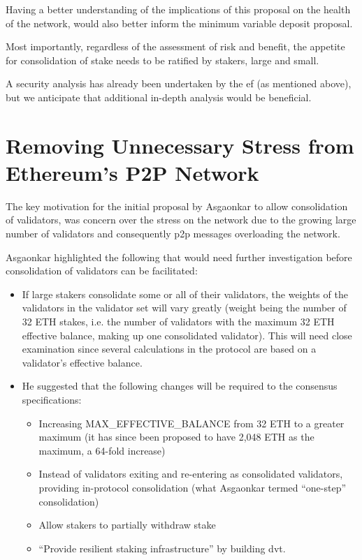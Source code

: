 \documentclass{article}
\begin{document}
Having a better understanding of the implications of this proposal on the
health of the network, would also better inform the minimum variable deposit
proposal. 

Most importantly, regardless of the assessment of risk and benefit, the
appetite for consolidation of stake needs to be ratified by stakers, large and
small.

A security analysis has already been undertaken by the \gls{ef}
\cite{Neuder2023b} (as mentioned above), but we anticipate that additional
in-depth analysis would be beneficial.

\section{Removing Unnecessary Stress from Ethereum’s P2P Network}
\label{sec:initial}
The key motivation for the initial proposal by Asgaonkar \cite{Asgaonkar2023}
to allow consolidation of validators, was concern over the stress on the
network due to the growing large number of validators and consequently
\gls{p2p} messages overloading the network. 

Asgaonkar \cite{Asgaonkar2023} highlighted the following that would need
further investigation before consolidation of validators can be facilitated:
\begin{itemize}
  \item If large stakers consolidate some or all of their validators, the
    weights of the validators in the validator set will vary greatly (weight
    being the number of 32 ETH stakes, i.e. the number of validators with the
    maximum 32 ETH effective balance, making up one consolidated validator).
    This will need close examination since several calculations in the protocol
    are based on a validator's effective balance.
  \item He suggested that the following changes will be required to the
    consensus specifications:
    \begin{itemize}
      \item Increasing MAX\_EFFECTIVE\_BALANCE from 32 ETH to a greater maximum
        (it has since been proposed to have 2,048 ETH as the maximum, a 64-fold
        increase)
      \item Instead of validators exiting and re-entering as consolidated
        validators, providing in-protocol consolidation (what Asgaonkar termed
        ``one-step'' consolidation)
      \item Allow stakers to partially withdraw stake
      \item ``Provide resilient staking infrastructure'' by building \gls{dvt}.
    \end{itemize}

\end{itemize}
\end{document}
